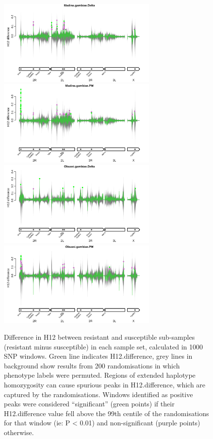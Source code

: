 \documentclass[a4paper,12pt]{article}
\begin{document}
\begin{figure}[h]
	\vskip 0.4cm
	\includegraphics*[width = 7.9cm]{../../randomisations/H12/Madina.gambiae.Delta_peak_filter_plot.png}
	\includegraphics*[width = 7.9cm]{../../randomisations/H12/Madina.gambiae.PM_peak_filter_plot.png}
	\vskip 0.4cm
	\includegraphics*[width = 7.9cm]{../../randomisations/H12/Obuasi.gambiae.Delta_peak_filter_plot.png}
	\includegraphics*[width = 7.9cm]{../../randomisations/H12/Obuasi.gambiae.PM_peak_filter_plot.png}
	\caption{\footnotesize Difference in H12 between resistant and susceptible sub-samples (resistant minus susceptible) in each sample set, calculated in 1000 SNP windows. Green line indicates H12.difference, grey lines in background show results from 200 randomisations in which phenotype labels were permuted. Regions of extended haplotype homozygosity can cause spurious peaks in H12.difference, which are captured by the randomisations. Windows identified as positive peaks were considered ``significant'' (green points) if their H12.difference value fell above the 99th centile of the randomisations for that window (ie: P < 0.01) and non-significant (purple points) otherwise.}
	\label{FigS3}
\end{figure}
\end{document}
